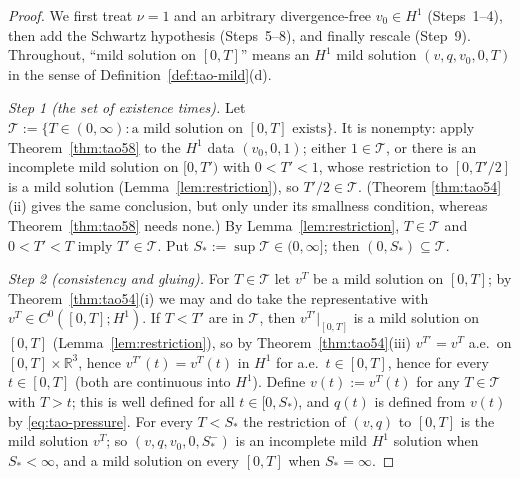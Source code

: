 \documentclass[11pt]{article}
\theoremstyle{definition}
\theoremstyle{plain}
\newcommand{\R}{\mathbb R}
\begin{document}
\begin{proof}
We first treat $\nu=1$ and an arbitrary divergence-free $v_0\in H^1$
(Steps~1--4), then add the Schwartz hypothesis (Steps~5--8), and finally
rescale (Step~9).  Throughout, ``mild solution on $[0,T]$'' means an
$H^1$ mild solution $(v,q,v_0,0,T)$ in the sense of
Definition~\ref{def:tao-mild}(d).

\emph{Step 1 (the set of existence times).}  Let $\mathcal T:=\{T\in
(0,\infty):\text{a mild solution on }[0,T]\text{ exists}\}$.  It is
nonempty: apply Theorem~\ref{thm:tao58} to the $H^1$ data $(v_0,0,1)$;
either $1\in\mathcal T$, or there is an incomplete mild solution on
$[0,T')$ with $0<T'<1$, whose restriction to $[0,T'/2]$ is a mild
solution (Lemma~\ref{lem:restriction}), so $T'/2\in\mathcal T$.  (Theorem
\ref{thm:tao54}(ii) gives the same conclusion, but only under its
smallness condition, whereas Theorem~\ref{thm:tao58} needs none.)  By
Lemma~\ref{lem:restriction}, $T\in\mathcal T$ and $0<T'<T$ imply
$T'\in\mathcal T$.  Put $S_*:=\sup\mathcal T\in(0,\infty]$; then
$(0,S_*)\subseteq\mathcal T$.

\emph{Step 2 (consistency and gluing).}  For $T\in\mathcal T$ let $v^T$
be a mild solution on $[0,T]$; by Theorem~\ref{thm:tao54}(i) we may and
do take the representative with $v^T\in C^0([0,T];H^1)$.  If $T<T'$ are in
$\mathcal T$, then $v^{T'}|_{[0,T]}$ is a mild solution on $[0,T]$
(Lemma~\ref{lem:restriction}), so by Theorem~\ref{thm:tao54}(iii)
$v^{T'}=v^T$ a.e.\ on $[0,T]\times\R^3$, hence $v^{T'}(t)=v^T(t)$ in $H^1$
for a.e.\ $t\in[0,T]$, hence for every $t\in[0,T]$ (both are continuous
into $H^1$).  Define $v(t):=v^T(t)$ for any $T\in\mathcal T$ with
$T>t$; this is well defined for all $t\in[0,S_*)$, and $q(t)$ is defined
from $v(t)$ by \eqref{eq:tao-pressure}.  For every $T<S_*$ the restriction
of $(v,q)$ to $[0,T]$ is the mild solution $v^T$; so $(v,q,v_0,0,S_*^-)$
is an incomplete mild $H^1$ solution when $S_*<\infty$, and a mild
solution on every $[0,T]$ when $S_*=\infty$.


\end{proof}
\end{document}
